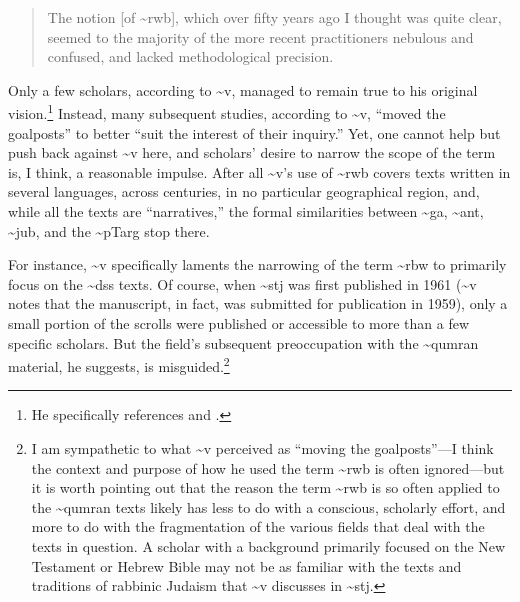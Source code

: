 \begin{quote}
The notion {[}of \textasciitilde{}rwb{]}, which over fifty years ago I
thought was quite clear, seemed to the majority of the more recent
practitioners nebulous and confused, and lacked methodological
precision.\autocite[3]{vermes_zsengeller2014}
\end{quote}

Only a few scholars, according to \textasciitilde{}v, managed to remain
true to his original vision.\footnote{He specifically references
  \textcite{alexander_carson-williamson1988} and
  \textcite{bernstein_textus2005}.} Instead, many subsequent studies,
according to \textasciitilde{}v, ``moved the goalposts'' to better
``suit the interest of their
inquiry.''\autocite[4]{vermes_zsengeller2014} Yet, one cannot help but
push back against \textasciitilde{}v here, and scholars' desire to
narrow the scope of the term is, I think, a reasonable impulse. After
all \textasciitilde{}v's use of \textasciitilde{}rwb covers texts
written in several languages, across centuries, in no particular
geographical region, and, while all the texts are ``narratives,'' the
formal similarities between \textasciitilde{}ga, \textasciitilde{}ant,
\textasciitilde{}jub, and the \textasciitilde{}pTarg stop there.

For instance, \textasciitilde{}v specifically laments the narrowing of
the term \textasciitilde{}rbw to primarily focus on the
\textasciitilde{}dss texts. Of course, when \textasciitilde{}stj was
first published in 1961 (\textasciitilde{}v notes that the manuscript,
in fact, was submitted for publication in 1959), only a small portion of
the scrolls were published or accessible to more than a few specific
scholars. But the field's subsequent preoccupation with the
\textasciitilde{}qumran material, he suggests, is misguided.\footnote{I
  am sympathetic to what \textasciitilde{}v perceived as ``moving the
  goalposts''---I think the context and purpose of how he used the term
  \textasciitilde{}rwb is often ignored---but it is worth pointing out
  that the reason the term \textasciitilde{}rwb is so often applied to
  the \textasciitilde{}qumran texts likely has less to do with a
  conscious, scholarly effort, and more to do with the fragmentation of
  the various fields that deal with the texts in question. A scholar
  with a background primarily focused on the New Testament or Hebrew
  Bible may not be as familiar with the texts and traditions of rabbinic
  Judaism that \textasciitilde{}v discusses in \textasciitilde{}stj.}

